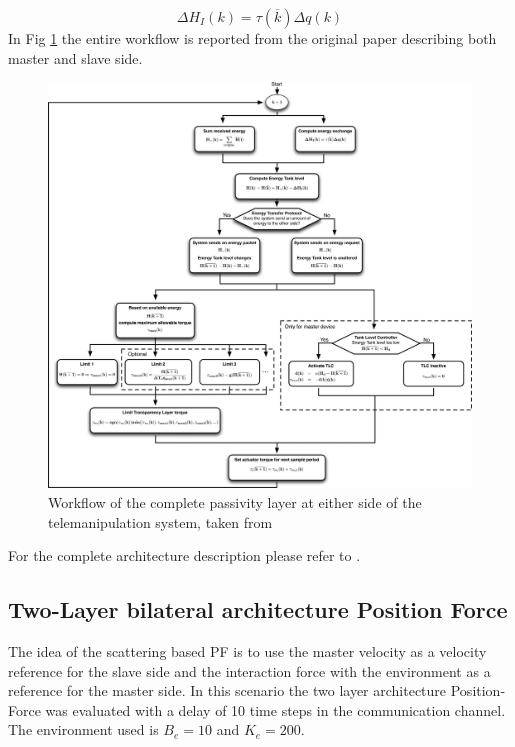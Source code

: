 \documentclass[a4paper,12pt]{article}
\begin{document}
\[
    \Delta H_I(k) = \tau(\overline{k}) \Delta q(k)
\]
In Fig \ref{fig:architecture} the entire workflow is reported from the original paper describing both master and slave side.
\begin{figure}[H]
    \begin{center}
        \hspace*{-2.2cm}
        \includegraphics[scale=0.28]{images/architecture.png}
    \end{center}
    \caption{Workflow of the complete passivity layer at either side of the telemanipulation system, taken from \cite{Franken11}}
    \label{fig:architecture}
\end{figure}

For the complete architecture description please refer to \cite{Franken11}.

\subsection{Two-Layer bilateral architecture Position Force}
The idea of the scattering based PF is to use the master velocity as a velocity reference for the slave side and the interaction force with the environment as a reference for the master side. In this scenario the two layer architecture Position-Force was evaluated with a delay of 10 time steps in the communication channel. The environment used is $B_e = 10$ and $K_e = 200$. 
\end{document}
